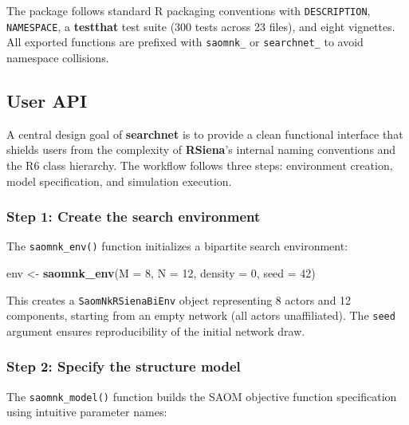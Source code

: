 \documentclass[
]{article}
\newenvironment{Shaded}{\begin{snugshade}}{\end{snugshade}}
\newcommand{\AttributeTok}[1]{\textcolor[rgb]{0.13,0.29,0.53}{#1}}
\newcommand{\DecValTok}[1]{\textcolor[rgb]{0.00,0.00,0.81}{#1}}
\newcommand{\FunctionTok}[1]{\textcolor[rgb]{0.13,0.29,0.53}{\textbf{#1}}}
\newcommand{\NormalTok}[1]{#1}
\newcommand{\OtherTok}[1]{\textcolor[rgb]{0.56,0.35,0.01}{#1}}
\begin{document}
The package follows standard \textsf{R} packaging conventions with
\texttt{DESCRIPTION}, \texttt{NAMESPACE}, a \textbf{testthat} test suite
(300 tests across 23 files), and eight vignettes. All exported functions
are prefixed with \texttt{saomnk\_} or \texttt{searchnet\_} to avoid
namespace collisions.

\subsection{User API}\label{sec:api}

A central design goal of \textbf{searchnet} is to provide a clean
functional interface that shields users from the complexity of
\textbf{RSiena}'s internal naming conventions and the R6 class
hierarchy. The workflow follows three steps: environment creation, model
specification, and simulation execution.

\subsubsection{Step 1: Create the search
environment}\label{step-1-create-the-search-environment}

The \texttt{saomnk\_env()} function initializes a bipartite search
environment:

\begin{Shaded}
\begin{Highlighting}[]
\NormalTok{env }\OtherTok{\textless{}{-}} \FunctionTok{saomnk\_env}\NormalTok{(}\AttributeTok{M =} \DecValTok{8}\NormalTok{, }\AttributeTok{N =} \DecValTok{12}\NormalTok{, }\AttributeTok{density =} \DecValTok{0}\NormalTok{, }\AttributeTok{seed =} \DecValTok{42}\NormalTok{)}
\end{Highlighting}
\end{Shaded}

This creates a \texttt{SaomNkRSienaBiEnv} object representing 8 actors
and 12 components, starting from an empty network (all actors
unaffiliated). The \texttt{seed} argument ensures reproducibility of the
initial network draw.

\subsubsection{Step 2: Specify the structure
model}\label{step-2-specify-the-structure-model}

The \texttt{saomnk\_model()} function builds the SAOM objective function
specification using intuitive parameter names:
\end{document}
